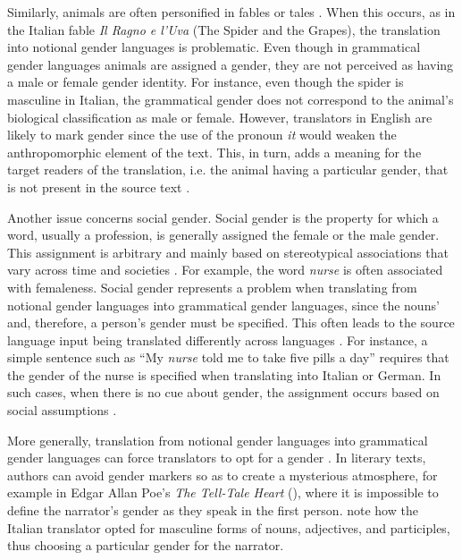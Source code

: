 Similarly, animals are often personified in fables or tales \citep[368]{di2020grammatical}. When this occurs, as in the Italian fable \textit{Il Ragno e l'Uva} (The Spider and the Grapes), the translation into notional gender languages is problematic. Even though in grammatical gender languages animals are assigned a gender, they are not perceived as having a male or female gender identity. For instance, even though the spider is masculine in Italian, the grammatical gender does not correspond to the animal's biological classification as male or female. However, translators in English are likely to mark gender since the use of the pronoun \textit{it} would weaken the anthropomorphic element of the text. This, in turn, adds a meaning for the target readers of the translation, i.e. the animal having a particular gender, that is not present in the source text \citep{di2020grammatical}. 

Another issue concerns social gender. Social gender is the property for which a word, usually a profession, is generally assigned the female or the male gender. This assignment is arbitrary and mainly based on stereotypical associations that vary across time and societies \citep[31]{nissen2002aspects}. For example, the word \textit{nurse} is often associated with femaleness. Social gender represents a problem when translating from notional gender languages into grammatical gender languages, since the nouns' and, therefore, a person's gender must be specified. This often leads to the source language input being translated differently across languages \citep[33--34]{nissen2002aspects}. For instance, a simple sentence such as ``My \textit{nurse} told me to take five pills a day'' requires that the gender of the nurse is specified when translating into Italian or German. In such cases, when there is no cue about gender, the assignment occurs based on social assumptions \citep[30]{nissen2002aspects}.

More generally, translation from notional gender languages into grammatical gender languages can force translators to opt for a gender \citep[367]{di2020grammatical}. In literary texts, authors can avoid gender markers so as to create a mysterious atmosphere, for example in Edgar Allan Poe's \textit{The Tell-Tale Heart} (\cite*{poe1843tell}), where it is impossible to define the narrator's gender as they speak in the first person. \textcite[369]{di2020grammatical} note how the Italian translator opted for masculine forms of nouns, adjectives, and participles, thus choosing a particular gender for the narrator. 

